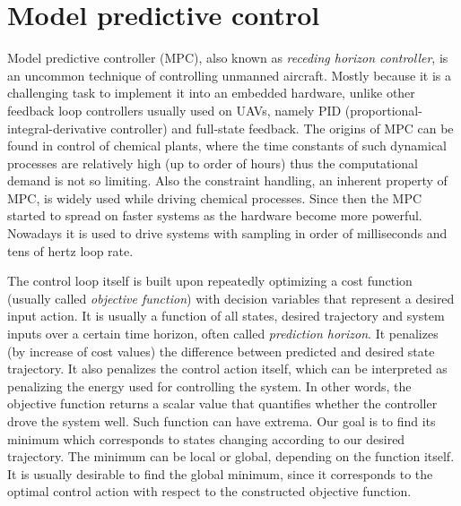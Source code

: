 \section{Model predictive control}
\label{cap:mpc_theory}

Model predictive controller (MPC), also known as \textit{receding horizon controller}, is an uncommon technique of controlling unmanned aircraft. Mostly because it is a challenging task to implement it into an embedded hardware, unlike other feedback loop controllers usually used on UAVs, namely PID (proportional-integral-derivative controller) and full-state feedback. The origins of MPC can be found in control of chemical plants, where the time constants of such dynamical processes are relatively high (up to order of hours) thus the computational demand is not so limiting. Also the constraint handling, an inherent property of MPC, is widely used while driving chemical processes. Since then the MPC started to spread on faster systems as the hardware become more powerful. Nowadays it is used to drive systems with sampling in order of milliseconds and tens of hertz loop rate.

The control loop itself is built upon repeatedly optimizing a cost function (usually called \emph{objective function}) with decision variables that represent a desired input action. It is usually a function of all states, desired trajectory and system inputs over a certain time horizon, often called \emph{prediction horizon}. It penalizes (by increase of cost values) the difference between predicted and desired state trajectory. It also penalizes the control action itself, which can be interpreted as penalizing the energy used for controlling the system. In other words, the objective function returns a scalar value that quantifies whether the controller drove the system well. Such function can have extrema. Our goal is to find its minimum which corresponds to states changing according to our desired trajectory. The minimum can be local or global, depending on the function itself. It is usually desirable to find the global minimum, since it corresponds to the optimal control action with respect to the constructed objective function.

